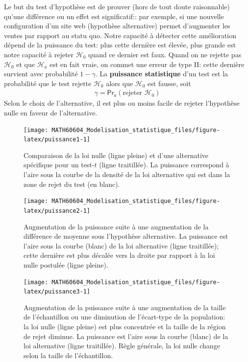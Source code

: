 \documentclass[
  11pt,
  letterpaper,
]{article}
\theoremstyle{definition}
\theoremstyle{definition}
\theoremstyle{definition}
\theoremstyle{definition}
\theoremstyle{remark}
\begin{document}
Le but du test d'hypothèse est de prouver (hors de tout doute raisonnable) qu'une différence ou un effet est significatif:: par exemple, si une nouvelle configuration d'un site web (hypothèse alternative) permet d'augmenter les ventes par rapport au statu quo. Notre capacité à détecter cette amélioration dépend de la puissance du test: plus cette dernière est élevée, plus grande est notre capacité à rejeter \(\mathscr{H}_0\) quand ce dernier est faux.
Quand on ne rejette pas \(\mathscr{H}_0\) et que \(\mathscr{H}_a\) est en fait vraie, on commet une erreur de type II: cette dernière survient avec probabilité \(1-\gamma\). La \textbf{puissance statistique} d'un test est la probabilité que le test rejette \(\mathscr{H}_0\) alors que \(\mathscr{H}_0\) est fausse, soit
\begin{align*}
\gamma = \mathsf{Pr}_a(\text{rejeter } \mathscr{H}_0)
\end{align*}
Selon le choix de l'alternative, il est plus ou moins facile de rejeter l'hypothèse nulle en faveur de l'alternative.

\begin{figure}

{\centering \texttt{[image: MATH60604\_Modelisation\_statistique\_files/figure-latex/puissance1-1]} 

}

\caption{Comparaison de la loi nulle (ligne pleine) et d'une alternative spécifique pour un test-$t$ (ligne traitillée). La puissance correspond à l'aire sous la courbe de la densité de la loi alternative qui est dans la zone de rejet du test (en blanc).}\label{fig:puissance1}
\end{figure}

\begin{figure}

{\centering \texttt{[image: MATH60604\_Modelisation\_statistique\_files/figure-latex/puissance2-1]} 

}

\caption{Augmentation de la puissance suite à une augmentation de la différence de moyenne sous l'hypothèse alternative. La puissance est l'aire sous la courbe (blanc) de la loi alternative (ligne traitillée); cette dernière est plus décalée vers la droite par rapport à la loi nulle postulée (ligne pleine).}\label{fig:puissance2}
\end{figure}

\begin{figure}

{\centering \texttt{[image: MATH60604\_Modelisation\_statistique\_files/figure-latex/puissance3-1]} 

}

\caption{Augmentation de la puissance suite à une augmentation de la taille de l'échantillon ou une diminution de l'écart-type de la population: la loi nulle (ligne pleine) est plus concentrée et la taille de la région de rejet diminue. La puissance est l'aire sous la courbe (blanc) de la loi alternative (ligne traitillée). Règle générale, la loi nulle change selon la taille de l'échantillon.}\label{fig:puissance3}
\end{figure}
\end{document}
